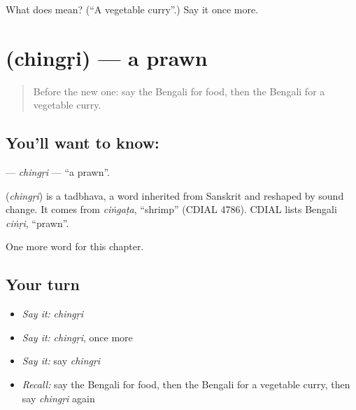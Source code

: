 \begin{tcolorbox}[breakable,colback=teal!4,colframe=teal!35!black,title={Before you move on}]
What does  mean? (\textquotedblleft{}A vegetable curry\textquotedblright{}.) Say it once more.
\end{tcolorbox}
\section[\texorpdfstring{\bn{চিংড়ি} (chingṛi)}{চিংড়ি (chingṛi)}]{ (chingṛi) — a prawn}

\label{lesson:BN-C223-chingri}



\begin{quote}
Before the new one: say the Bengali for food, then the Bengali for a vegetable curry.
\end{quote}

\subsection*{You'll want to know: }
\textbf{} — \emph{chingṛi} — \textquotedblleft{}a prawn\textquotedblright{}.

\begin{cousinweb}
\textbf{} (\emph{chingṛi}) is a tadbhava, a word inherited from Sanskrit and reshaped by sound change. It comes from \emph{ciṅgaṭa}, \textquotedblleft{}shrimp\textquotedblright{} (CDIAL 4786). CDIAL lists Bengali \emph{ciṅṛi}, \textquotedblleft{}prawn\textquotedblright{}.
\end{cousinweb}

\begin{grammarlens}[title={What you've built}]
One more word for this chapter.
\end{grammarlens}

\subsection*{Your turn}
\begin{itemize}
\raggedright
  \item \emph{Say it:} \emph{chingṛi}
  \item \emph{Say it:} \emph{chingṛi}, once more
  \item \emph{Say it:} say \emph{chingṛi}
  \item \emph{Recall:} say the Bengali for food, then the Bengali for a vegetable curry, then say \emph{chingṛi} again
\end{itemize}

